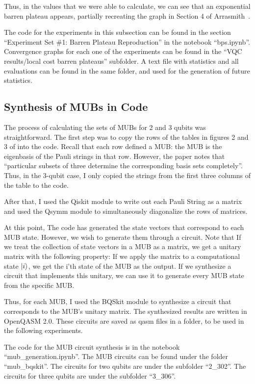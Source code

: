 \documentclass[a4paper,12pt]{article}
\begin{document}
Thus, in the values that we were able to calculate, we can see that an exponential barren plateau appears, partially recreating the graph in Section 4 of Arrasmith~\cite{arrasmith_effect_2021}.

The code for the experiments in this subsection can be found in the section ``Experiment Set \#1: Barren Plateau Reproduction'' in the notebook ``bps.ipynb''.
Convergence graphs for each one of the experiments can be found in the ``VQC results/local cost barren plateaus'' subfolder. A text file with statistics and all evaluations can be found in the same folder, and used for the generation of future statistics.

\subsection{Synthesis of MUBs in Code} \label{subsec:mub_synthesis}
The process of calculating the sets of MUBs for 2 and 3 qubits was straightforward.
The first step was to copy the rows of the tables in figures 2 and 3 of \cite{lawrence_mutually_2002} into the code.
Recall that each row defined a MUB: the MUB is the eigenbasis of the Pauli strings in that row.
However, the paper notes that ``particular subsets of three determine the corresponding basis sets completely''.
Thus, in the 3-qubit case, I only copied the strings from the first three columns of the table to the code.

After that, I used the Qiskit module to write out each Pauli String as a matrix and used the Qsymm module to simultaneously diagonalize the rows of matrices.

At this point, The code has generated the state vectors that correspond to each MUB state. However, we wish to generate them through a circuit.
Note that If we treat the collection of state vectors in a MUB as a matrix, we get a unitary matrix with the following property:
If we apply the matrix to a computational state $\ket{i}$, we get the i'th state of the MUB as the output.
If we synthesize a circuit that implements this unitary, we can use it to generate every MUB state from the specific MUB.

Thus, for each MUB, I used the BQSkit module to synthesize a circuit that corresponds to the MUB's unitary matrix.
The synthesized results are written in OpenQASM 2.0.
These circuits are saved as qasm files in a folder, to be used in the following experiments.

The code for the MUB circuit synthesis is in the notebook ``mub\_generation.ipynb''.
The MUB circuits can be found under the folder ``mub\_bqskit''.
The circuits for two qubits are under the subfolder ``2\_302''. The circuits for three qubits are under the subfolder ``3\_306''.
\end{document}
